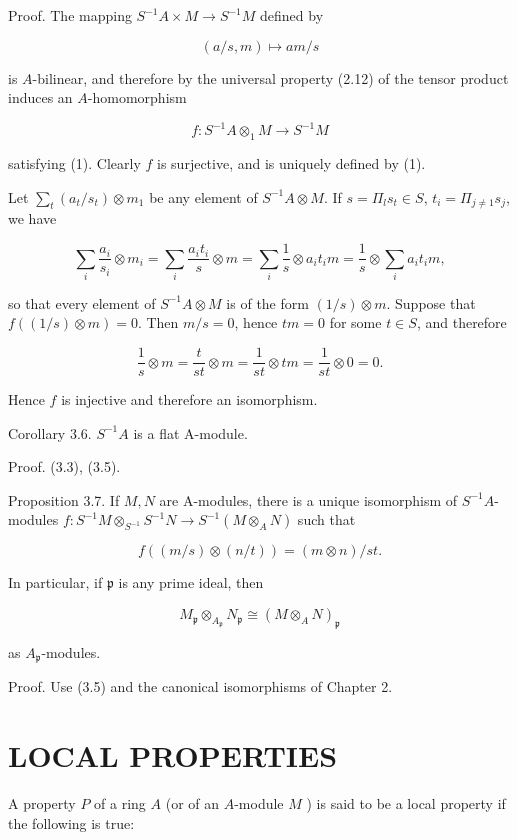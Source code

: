 \documentclass{standalone}
\theoremstyle{definition}
\theoremstyle{remark}
\begin{document}
Proof. The mapping $S^{-1} A \times M \rightarrow S^{-1} M$ defined by

\[
(a / s, m) \mapsto a m / s
\]

is $A$-bilinear, and therefore by the universal property (2.12) of the tensor product induces an $A$-homomorphism

\[
f: S^{-1} A \otimes_{1} M \rightarrow S^{-1} M
\]

satisfying (1). Clearly $f$ is surjective, and is uniquely defined by (1).

Let $\sum_{t}\left(a_{t} / s_{t}\right) \otimes m_{1}$ be any element of $S^{-1} A \otimes M$. If $s=\Pi_{l} s_{t} \in S$, $t_{i}=\Pi_{j \neq 1} s_{j}$, we have

\[
\sum_{i} \frac{a_{i}}{s_{i}} \otimes m_{i}=\sum_{i} \frac{a_{i} t_{i}}{s} \otimes m=\sum_{i} \frac{1}{s} \otimes a_{i} t_{i} m=\frac{1}{s} \otimes \sum_{i} a_{i} t_{i} m,
\]

so that every element of $S^{-1} A \otimes M$ is of the form $(1 / s) \otimes m$. Suppose that $f((1 / s) \otimes m)=0$. Then $m / s=0$, hence $t m=0$ for some $t \in S$, and therefore

\[
\frac{1}{s} \otimes m=\frac{t}{s t} \otimes m=\frac{1}{s t} \otimes t m=\frac{1}{s t} \otimes 0=0 .
\]

Hence $f$ is injective and therefore an isomorphism.

Corollary 3.6. $S^{-1} A$ is a flat A-module.

Proof. (3.3), (3.5).

Proposition 3.7. If $M, N$ are A-modules, there is a unique isomorphism of $S^{-1} A$-modules $f: S^{-1} M \otimes_{S^{-1}} S^{-1} N \rightarrow S^{-1}\left(M \otimes_{A} N\right)$ such that

\[
f((m / s) \otimes(n / t))=(m \otimes n) / s t .
\]

In particular, if $\mathfrak{p}$ is any prime ideal, then

\[
M_{\mathfrak{p}} \otimes_{A_{\mathfrak{p}}} N_{\mathfrak{p}} \cong\left(M \otimes_{A} N\right)_{\mathfrak{p}}
\]

as $A_{\mathfrak{p}}$-modules.

Proof. Use (3.5) and the canonical isomorphisms of Chapter 2.

\section{LOCAL PROPERTIES}
A property $P$ of a ring $A$ (or of an $A$-module $M$ ) is said to be a local property if the following is true:
\end{document}

